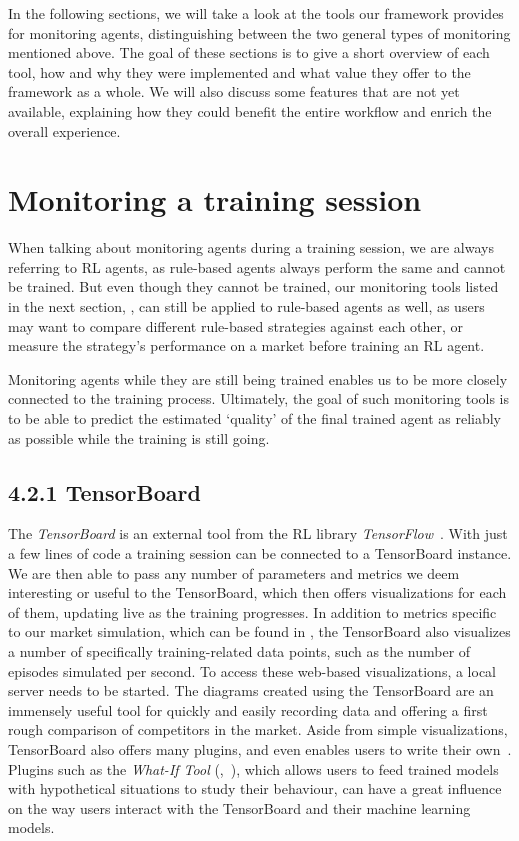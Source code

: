 In the following sections, we will take a look at the tools our framework provides for monitoring agents, distinguishing between the two general types of monitoring mentioned above. The goal of these sections is to give a short overview of each tool, how and why they were implemented and what value they offer to the framework as a whole. We will also discuss some features that are not yet available, explaining how they could benefit the entire workflow and enrich the overall experience.

\section{Monitoring a training session}

When talking about monitoring agents during a training session, we are always referring to RL agents, as rule-based agents always perform the same and cannot be trained. But even though they cannot be trained, our monitoring tools listed in the next section, , can still be applied to rule-based agents as well, as users may want to compare different rule-based strategies against each other, or measure the strategy's performance on a market before training an RL agent.

Monitoring agents while they are still being trained enables us to be more closely connected to the training process. Ultimately, the goal of such monitoring tools is to be able to predict the estimated `quality' of the final trained agent as reliably as possible while the training is still going.

\subsection*{4.2.1 TensorBoard}\label{subsec:TensorBoard}

The \emph{TensorBoard} is an external tool from the RL library \emph{TensorFlow}~\cite{TensorFlow}. With just a few lines of code a training session can be connected to a TensorBoard instance. We are then able to pass any number of parameters and metrics we deem interesting or useful to the TensorBoard, which then offers visualizations for each of them, updating live as the training progresses. In addition to metrics specific to our market simulation, which can be found in , the TensorBoard also visualizes a number of specifically training-related data points, such as the number of episodes simulated per second. To access these web-based visualizations, a local server needs to be started. The diagrams created using the TensorBoard are an immensely useful tool for quickly and easily recording data and offering a first rough comparison of competitors in the market. Aside from simple visualizations, TensorBoard also offers many plugins, and even enables users to write their own~\cite{TensorBoardPlugins}. Plugins such as the \emph{What-If Tool} (\cite{WhatIfTool},~\cite{WhatIfToolWeb}), which allows users to feed trained models with hypothetical situations to study their behaviour, can have a great influence on the way users interact with the TensorBoard and their machine learning models.

